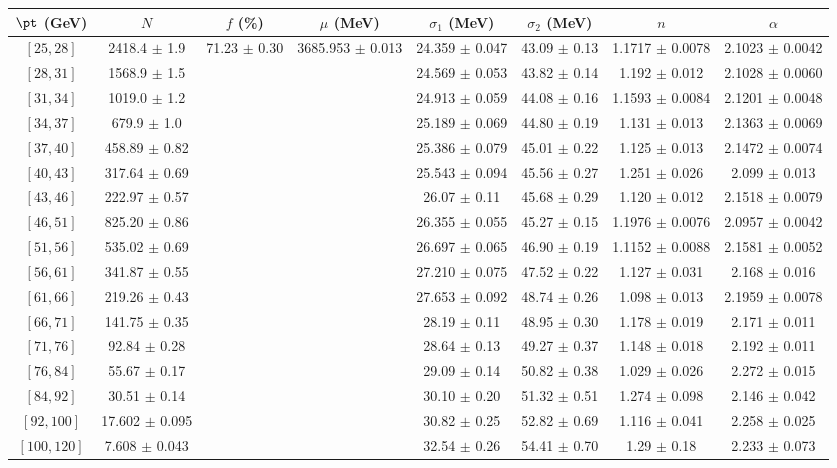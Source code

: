 \begin{tabular}{c||c|c|c|c|c|c|c}
$\pt$ (GeV) & $N$ & $f$ (\%) & $\mu$ (MeV) & $\sigma_1$ (MeV) & $\sigma_2$ (MeV) & $n$ & $\alpha$ \\
\hline
$[25, 28]$ & 2418.4 $\pm$ 1.9 & \multirow{17}{*}{71.23 $\pm$ 0.30} & \multirow{17}{*}{3685.953 $\pm$ 0.013} & 24.359 $\pm$ 0.047 & 43.09 $\pm$ 0.13 & 1.1717 $\pm$ 0.0078 & 2.1023 $\pm$ 0.0042\\
$[28, 31]$ & 1568.9 $\pm$ 1.5 &  &  & 24.569 $\pm$ 0.053 & 43.82 $\pm$ 0.14 & 1.192 $\pm$ 0.012 & 2.1028 $\pm$ 0.0060\\
$[31, 34]$ & 1019.0 $\pm$ 1.2 &  &  & 24.913 $\pm$ 0.059 & 44.08 $\pm$ 0.16 & 1.1593 $\pm$ 0.0084 & 2.1201 $\pm$ 0.0048\\
$[34, 37]$ & 679.9 $\pm$ 1.0 &  &  & 25.189 $\pm$ 0.069 & 44.80 $\pm$ 0.19 & 1.131 $\pm$ 0.013 & 2.1363 $\pm$ 0.0069\\
$[37, 40]$ & 458.89 $\pm$ 0.82 &  &  & 25.386 $\pm$ 0.079 & 45.01 $\pm$ 0.22 & 1.125 $\pm$ 0.013 & 2.1472 $\pm$ 0.0074\\
$[40, 43]$ & 317.64 $\pm$ 0.69 &  &  & 25.543 $\pm$ 0.094 & 45.56 $\pm$ 0.27 & 1.251 $\pm$ 0.026 & 2.099 $\pm$ 0.013\\
$[43, 46]$ & 222.97 $\pm$ 0.57 &  &  & 26.07 $\pm$ 0.11 & 45.68 $\pm$ 0.29 & 1.120 $\pm$ 0.012 & 2.1518 $\pm$ 0.0079\\
$[46, 51]$ & 825.20 $\pm$ 0.86 &  &  & 26.355 $\pm$ 0.055 & 45.27 $\pm$ 0.15 & 1.1976 $\pm$ 0.0076 & 2.0957 $\pm$ 0.0042\\
$[51, 56]$ & 535.02 $\pm$ 0.69 &  &  & 26.697 $\pm$ 0.065 & 46.90 $\pm$ 0.19 & 1.1152 $\pm$ 0.0088 & 2.1581 $\pm$ 0.0052\\
$[56, 61]$ & 341.87 $\pm$ 0.55 &  &  & 27.210 $\pm$ 0.075 & 47.52 $\pm$ 0.22 & 1.127 $\pm$ 0.031 & 2.168 $\pm$ 0.016\\
$[61, 66]$ & 219.26 $\pm$ 0.43 &  &  & 27.653 $\pm$ 0.092 & 48.74 $\pm$ 0.26 & 1.098 $\pm$ 0.013 & 2.1959 $\pm$ 0.0078\\
$[66, 71]$ & 141.75 $\pm$ 0.35 &  &  & 28.19 $\pm$ 0.11 & 48.95 $\pm$ 0.30 & 1.178 $\pm$ 0.019 & 2.171 $\pm$ 0.011\\
$[71, 76]$ & 92.84 $\pm$ 0.28 &  &  & 28.64 $\pm$ 0.13 & 49.27 $\pm$ 0.37 & 1.148 $\pm$ 0.018 & 2.192 $\pm$ 0.011\\
$[76, 84]$ & 55.67 $\pm$ 0.17 &  &  & 29.09 $\pm$ 0.14 & 50.82 $\pm$ 0.38 & 1.029 $\pm$ 0.026 & 2.272 $\pm$ 0.015\\
$[84, 92]$ & 30.51 $\pm$ 0.14 &  &  & 30.10 $\pm$ 0.20 & 51.32 $\pm$ 0.51 & 1.274 $\pm$ 0.098 & 2.146 $\pm$ 0.042\\
$[92, 100]$ & 17.602 $\pm$ 0.095 &  &  & 30.82 $\pm$ 0.25 & 52.82 $\pm$ 0.69 & 1.116 $\pm$ 0.041 & 2.258 $\pm$ 0.025\\
$[100, 120]$ & 7.608 $\pm$ 0.043 &  &  & 32.54 $\pm$ 0.26 & 54.41 $\pm$ 0.70 & 1.29 $\pm$ 0.18 & 2.233 $\pm$ 0.073\\
\end{tabular}
